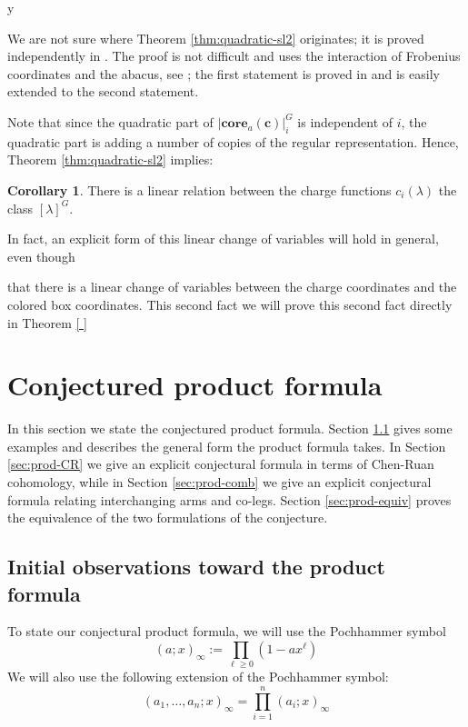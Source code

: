 y\documentclass{amsart}[12pt]
\theoremstyle{definition}
\newtheorem{corollary}[dummy]{Corollary}
\newcommand{\core}{\mathbf{core}}
\begin{document}
We are not sure where Theorem \ref{thm:quadratic-sl2} originates; it is proved independently in \cite{GKS, DS}.  The proof is not difficult and uses the interaction of Frobenius coordinates and the abacus, see ; the first statement is proved in \cite{jsimultaneous} and is easily extended to the second statement. 


Note that since the quadratic part of $|\core_a(\mathbf{c})|^G_i$ is independent of $i$, the quadratic part is adding a number of copies of the regular representation.  Hence, Theorem \ref{thm:quadratic-sl2} implies:




\begin{corollary} 
There is a linear relation between the charge functions $c_i(\lambda)$ the class $[\lambda]^G$.
\end{corollary}

In fact, an explicit form of this linear change of variables will hold in general, even though



 that there is a linear change of variables between the charge coordinates and the colored box coordinates.  This second fact we will prove this second fact directly in Theorem \ref{ }



\section{Conjectured product formula}


In this section we state the conjectured product formula.  Section \ref{sec:prod-start} gives some examples and describes the general form the product formula takes.  In Section \ref{sec:prod-CR} we give an explicit conjectural formula in terms of Chen-Ruan cohomology, while in Section \ref{sec:prod-comb} we give an explicit conjectural formula relating interchanging arms and co-legs.  Section \ref{sec:prod-equiv} proves the equivalence of the two formulations of the conjecture.


\subsection{Initial observations toward the product formula}
\label{sec:prod-start}

To state our conjectural product formula, we will use the Pochhammer symbol 
$$(a;x)_\infty:=\prod_{\ell\geq 0} (1-ax^\ell)$$
We will also use the following extension of the Pochhammer symbol:
$$(a_1,\dots, a_n; x)_\infty=\prod_{i=1}^n (a_i;x)_\infty$$
\end{document}
